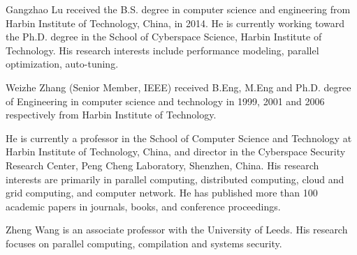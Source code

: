 \documentclass[journal,compsoc,10pt,final]{IEEEtran}
\begin{document}


\begin{IEEEbiography}{Gangzhao Lu}
 received the B.S. degree in computer science and engineering from Harbin Institute of Technology, China, in 2014. He is currently working toward the Ph.D. degree in the School of Cyberspace Science, Harbin Institute of Technology. His research interests include performance modeling, parallel optimization, auto-tuning.
\end{IEEEbiography}
\begin{IEEEbiography}{Weizhe Zhang} (Senior Member, IEEE) received B.Eng, M.Eng and Ph.D. degree of Engineering in computer science and technology in 1999, 2001 and 2006 respectively from Harbin Institute of Technology.

He is currently a professor in the School of Computer Science and Technology at Harbin Institute of Technology, China, and director in the Cyberspace Security Research Center, Peng Cheng Laboratory, Shenzhen, China. His research interests are primarily in parallel computing, distributed computing, cloud and grid computing, and computer network. He has published more than 100 academic papers in journals, books, and conference proceedings.
\end{IEEEbiography}
\begin{IEEEbiography}{Zheng Wang} is
an associate professor with the University of Leeds. His research focuses on parallel computing, compilation and systems security.
\end{IEEEbiography}
\end{document}

